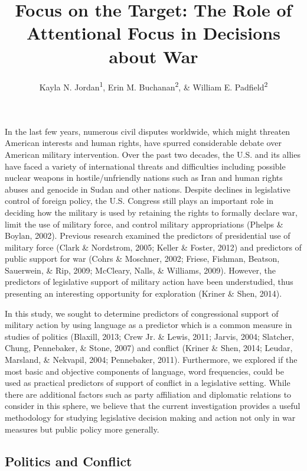 \documentclass[english,man]{apa6}
\title{Focus on the Target: The Role of Attentional Focus in Decisions about
War}
\author{Kayla N. Jordan\textsuperscript{1}, Erin M. Buchanan\textsuperscript{2}, \& William E. Padfield\textsuperscript{2}}
\affiliation{
    \vspace{0.5cm}
          \textsuperscript{1} University of Texas - Austin\\
          \textsuperscript{2} Missouri State University  }
\theoremstyle{definition}
\theoremstyle{definition}
\theoremstyle{definition}
\theoremstyle{remark}
\begin{document}
\maketitle

\setcounter{secnumdepth}{0}



In the last few years, numerous civil disputes worldwide, which might
threaten American interests and human rights, have spurred considerable
debate over American military intervention. Over the past two decades,
the U.S. and its allies have faced a variety of international threats
and difficulties including possible nuclear weapons in
hostile/unfriendly nations such as Iran and human rights abuses and
genocide in Sudan and other nations. Despite declines in legislative
control of foreign policy, the U.S. Congress still plays an important
role in deciding how the military is used by retaining the rights to
formally declare war, limit the use of military force, and control
military appropriations (Phelps \& Boylan, 2002). Previous research
examined the predictors of presidential use of military force (Clark \&
Nordstrom, 2005; Keller \& Foster, 2012) and predictors of public
support for war (Cohrs \& Moschner, 2002; Friese, Fishman, Beatson,
Sauerwein, \& Rip, 2009; McCleary, Nalls, \& Williams, 2009). However,
the predictors of legislative support of military action have been
understudied, thus presenting an interesting opportunity for exploration
(Kriner \& Shen, 2014).

In this study, we sought to determine predictors of congressional
support of military action by using language as a predictor which is a
common measure in studies of politics (Blaxill, 2013; Crew Jr. \& Lewis,
2011; Jarvis, 2004; Slatcher, Chung, Pennebaker, \& Stone, 2007) and
conflict (Kriner \& Shen, 2014; Leudar, Marsland, \& Nekvapil, 2004;
Pennebaker, 2011). Furthermore, we explored if the most basic and
objective components of language, word frequencies, could be used as
practical predictors of support of conflict in a legislative setting.
While there are additional factors such as party affiliation and
diplomatic relations to consider in this sphere, we believe that the
current investigation provides a useful methodology for studying
legislative decision making and action not only in war measures but
public policy more generally.

\subsection{Politics and Conflict}\label{politics-and-conflict}
\end{document}
